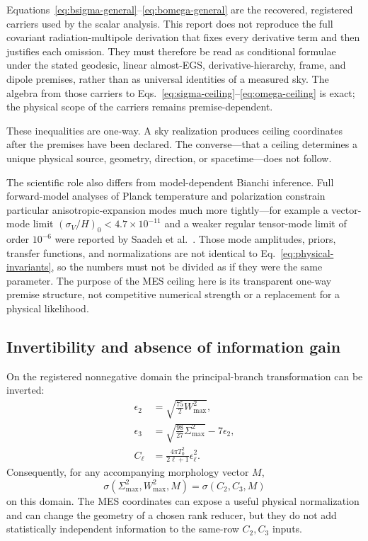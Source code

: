 \documentclass[11pt,a4paper]{article}
\begin{document}
Equations~\eqref{eq:bsigma-general}--\eqref{eq:bomega-general} are the
recovered, registered carriers used by the scalar analysis.  This report does
not reproduce the full covariant radiation-multipole derivation that fixes
every derivative term and then justifies each omission.  They must therefore
be read as conditional formulae under the stated geodesic, linear almost-EGS,
derivative-hierarchy, frame, and dipole premises, rather than as universal
identities of a measured sky.  The algebra from those carriers to
Eqs.~\eqref{eq:sigma-ceiling}--\eqref{eq:omega-ceiling} is exact; the physical
scope of the carriers remains premise-dependent.

These inequalities are one-way.  A sky realization produces ceiling
coordinates after the premises have been declared.  The converse---that a
ceiling determines a unique physical source, geometry, direction, or
spacetime---does not follow.

The scientific role also differs from model-dependent Bianchi inference.
Full forward-model analyses of Planck temperature and polarization constrain
particular anisotropic-expansion modes much more tightly---for example a
vector-mode limit $(\sigma_V/H)_0<4.7\times10^{-11}$ and a weaker regular
tensor-mode limit of order $10^{-6}$ were reported by
Saadeh et al.~\cite{SaadehEtAl2016}.  Those mode amplitudes, priors, transfer
functions, and normalizations are not identical to
Eq.~\eqref{eq:physical-invariants}, so the numbers must not be divided as if
they were the same parameter.  The purpose of the MES ceiling here is its
transparent one-way premise structure, not competitive numerical strength or
a replacement for a physical likelihood.

\subsection{Invertibility and absence of information gain}

On the registered nonnegative domain the principal-branch transformation can
be inverted:
\begin{align}
\epsilon_2&=\sqrt{\frac{75}{2}W^2_{\max}},\\
\epsilon_3&=\sqrt{\frac{98}{27}\Sigma^2_{\max}}-7\epsilon_2,\\
C_\ell&=\frac{4\pi T_0^2}{2\ell+1}\epsilon_\ell^2.
\end{align}
Consequently, for any accompanying morphology vector $M$,
\begin{equation}
\sigma(\Sigma^2_{\max},W^2_{\max},M)
=\sigma(C_2,C_3,M)
\label{eq:information-identity}
\end{equation}
on this domain.  The MES coordinates can expose a useful physical
normalization and can change the geometry of a chosen rank reducer, but they do
not add statistically independent information to the same-row $C_2,C_3$
inputs.
\end{document}
